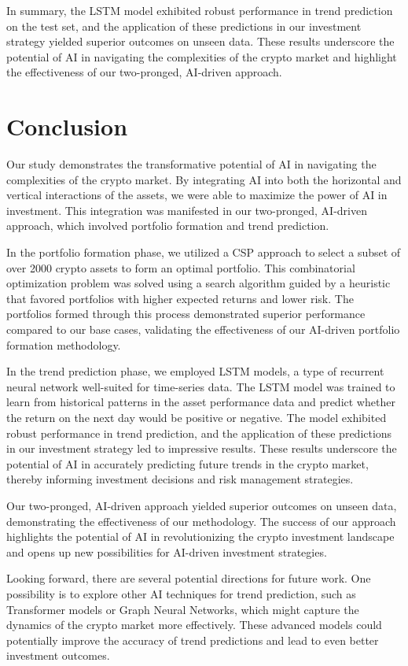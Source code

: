 \documentclass[journal]{IEEEtran}
\begin{document}
In summary, the LSTM model exhibited robust performance in trend prediction on the test set, and the application of these predictions in our investment strategy yielded superior outcomes on unseen data. These results underscore the potential of AI in navigating the complexities of the crypto market and highlight the effectiveness of our two-pronged, AI-driven approach.

\section{Conclusion}
Our study demonstrates the transformative potential of AI in navigating the complexities of the crypto market. By integrating AI into both the horizontal and vertical interactions of the assets, we were able to maximize the power of AI in investment. This integration was manifested in our two-pronged, AI-driven approach, which involved portfolio formation and trend prediction.

In the portfolio formation phase, we utilized a CSP approach to select a subset of over 2000 crypto assets to form an optimal portfolio. This combinatorial optimization problem was solved using a search algorithm guided by a heuristic that favored portfolios with higher expected returns and lower risk. The portfolios formed through this process demonstrated superior performance compared to our base cases, validating the effectiveness of our AI-driven portfolio formation methodology.

In the trend prediction phase, we employed LSTM models, a type of recurrent neural network well-suited for time-series data. The LSTM model was trained to learn from historical patterns in the asset performance data and predict whether the return on the next day would be positive or negative. The model exhibited robust performance in trend prediction, and the application of these predictions in our investment strategy led to impressive results. These results underscore the potential of AI in accurately predicting future trends in the crypto market, thereby informing investment decisions and risk management strategies.

Our two-pronged, AI-driven approach yielded superior outcomes on unseen data, demonstrating the effectiveness of our methodology. The success of our approach highlights the potential of AI in revolutionizing the crypto investment landscape and opens up new possibilities for AI-driven investment strategies.

Looking forward, there are several potential directions for future work. One possibility is to explore other AI techniques for trend prediction, such as Transformer models or Graph Neural Networks, which might capture the dynamics of the crypto market more effectively. These advanced models could potentially improve the accuracy of trend predictions and lead to even better investment outcomes.
\end{document}

